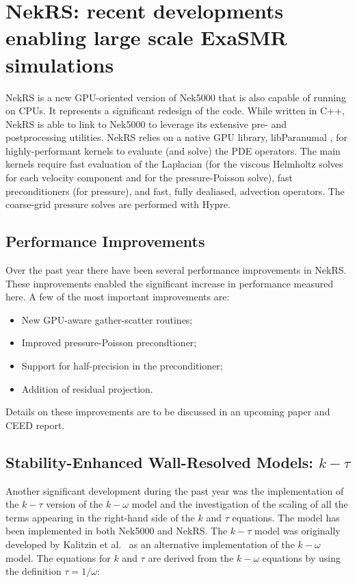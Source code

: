\section{NekRS: recent developments enabling large scale ExaSMR simulations}
\label{sec:nekrs}

NekRS is a new GPU-oriented version of Nek5000  that is also capable of running
on CPUs. It represents a significant redesign of the code. While written in
C++, NekRS is able to link to Nek5000 to leverage its extensive pre- and
postprocessing utilities. NekRS relies on a native GPU library,
libParanumal \cite{libP}, for highly-performant kernels to evaluate (and
solve) the PDE operators.  The main kernels require fast evaluation of the
Laplacian (for the viscous Helmholtz solves for each velocity component and
for the pressure-Poisson solve), fast preconditioners (for pressure), and
fast, fully dealiased, advection operators.  The coarse-grid pressure solves
are performed with Hypre.

\subsection{Performance Improvements}

Over the past year there have been several performance improvements in NekRS. These improvements enabled the significant increase in performance measured here.
A few of the most important improvements are:
\begin{itemize}
  \item New GPU-aware gather-scatter routines;
  \item Improved pressure-Poisson precondtioner;
  \item Support for half-precision in the preconditioner;
  \item Addition of residual projection.
\end{itemize}
Details on these improvements are to be discussed in an upcoming paper and CEED report.

\subsection{Stability-Enhanced Wall-Resolved Models: $k-\tau$}
Another significant development during the past year was the implementation of the $k-\tau$
version of the $k-\omega$ model and the investigation of the scaling of all the terms appearing in
the right-hand side of the $k$ and $\tau$ equations. The model has been implemented in both Nek5000 and NekRS. The $k-\tau$ model was originally developed by Kalitzin et al.~\cite{benton01} as an alternative
implementation of the $k-\omega$ model. The equations for $k$ and $\tau$ are derived from the $k-\omega$
equations by using the definition $\tau=1/\omega$:

